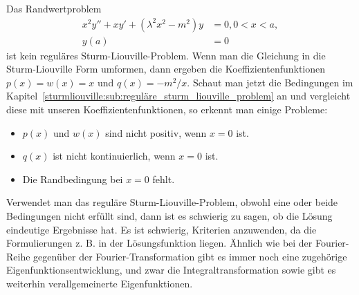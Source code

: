 \begin{beispiel}
	Das Randwertproblem
	\begin{equation}
		\begin{aligned}
		x^2y'' + xy' + (\lambda^2x^2 - m^2)y &= 0, 0<x<a,\\
		y(a) &= 0
		\end{aligned}
	\end{equation}
	ist kein reguläres Sturm-Liouville-Problem.
	Wenn man die Gleichung in die Sturm-Liouville Form umformen, dann ergeben
	die Koeffizientenfunktionen $p(x) = w(x) = x$ und $q(x) = -m^2/x$.
	Schaut man jetzt die Bedingungen im
	Kapitel~\ref{sturmliouville:sub:reguläre_sturm_liouville_problem} an und 
	vergleicht diese mit unseren Koeffizientenfunktionen, so erkennt man einige
	Probleme:
	\begin{itemize}
		\item $p(x)$ und $w(x)$ sind nicht positiv, wenn $x = 0$ ist.
		\item $q(x)$ ist nicht kontinuierlich, wenn $x = 0$ ist.
		\item Die Randbedingung bei $x = 0$ fehlt.
	\end{itemize}
\end{beispiel}

Verwendet man das reguläre Sturm-Liouville-Problem, obwohl eine oder beide
Bedingungen nicht erfüllt sind, dann ist es schwierig zu sagen, ob die Lösung
eindeutige Ergebnisse hat.
Es ist schwierig, Kriterien anzuwenden, da die Formulierungen z. B. in der
Lösungsfunktion liegen.
Ähnlich wie bei der Fourier-Reihe gegenüber der Fourier-Transformation gibt es
immer noch eine zugehörige Eigenfunktionsentwicklung, und zwar die
Integraltransformation sowie gibt es weiterhin verallgemeinerte Eigenfunktionen.
